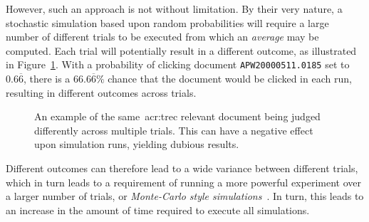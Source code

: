 However, such an approach is not without limitation. By their very nature, a stochastic simulation based upon random probabilities will require a large number of different trials to be executed from which an \emph{average} may be computed. Each trial will potentially result in a different outcome, as illustrated in Figure~\ref{fig:multiple_runs}. With a probability of clicking document \texttt{APW20000511.0185} set to $0.6\overline{6}$, there is a $66.6\overline{6}\%$ chance that the document would be clicked in each run, resulting in different outcomes across trials.

\begin{figure}[t!]
    \centering
    \vspace{4mm}
    \caption[Stochastic judging across multiple trials]{An example of the same~\gls{acr:trec} relevant document being judged differently across multiple trials. This can have a negative effect upon simulation runs, yielding dubious results.}
    \label{fig:multiple_runs}
\end{figure}

Different outcomes can therefore lead to a wide variance between different trials, which in turn leads to a requirement of running a more powerful experiment over a larger number of trials, or \emph{Monte-Carlo style simulations}~\citep{benov2016manhattan}. In turn, this leads to an increase in the amount of time required to execute all simulations.

